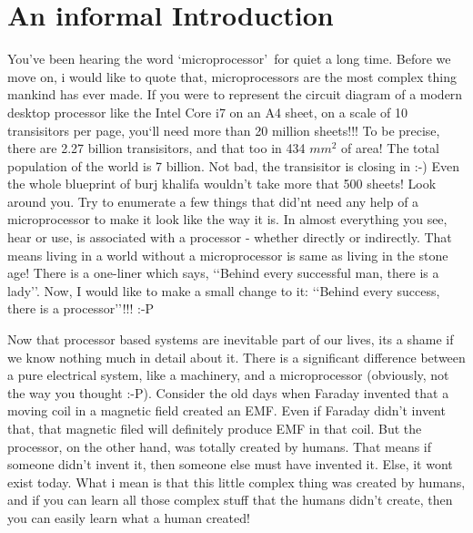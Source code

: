 \documentclass{book}
\begin{document}
\chapter{An informal Introduction}

You\rq ve been hearing the word \lq microprocessor\rq\ for quiet a long time.
Before we move on, i would like to quote that, microprocessors
are the most complex thing mankind has ever made. If you were to represent the
circuit diagram of a modern desktop processor like the Intel Core i7 on an A4
sheet, on a scale of 10 transisitors per page, you`ll need more than 20 million
sheets!!! To be precise, there are 2.27 billion transisitors, and that too in 434 $mm^2$ of area! The total population of the world is 7 billion. Not bad, the transisitor is closing in :-) Even the whole blueprint of burj khalifa wouldn\rq t take more that
500 sheets! Look around you. Try to enumerate a few things that did\rq nt need
any help of a microprocessor to make it look like the way it is. In almost
everything you see, hear or use, is associated with a processor - whether
directly or indirectly. That means living in a world without a microprocessor is
same as living in the stone age! There is a one-liner which says, \lq\lq Behind
every successful man, there is a lady\rq\rq. Now, I would like to make a small
change to it: \lq\lq Behind every success, there is a processor\rq\rq!!! :-P

Now that processor based systems are inevitable part of our lives, its a shame
if we know nothing much in detail about it. There is a significant difference
between a pure electrical system, like a machinery, and a microprocessor
(obviously,
not the way you thought :-P). Consider the old days when Faraday invented that a
moving coil in a magnetic field created an EMF. Even if Faraday didn\rq t
invent that, that magnetic filed will definitely produce EMF in that coil. But
the
processor, on the other hand, was totally created by humans. That means if
someone didn\rq t invent it, then someone else must have invented it. Else, it
wont exist today. What i mean is that this little complex thing was created by
humans, and if you can learn all those complex stuff that the humans didn\rq t
create, then you can easily learn what a human created!
\end{document}
